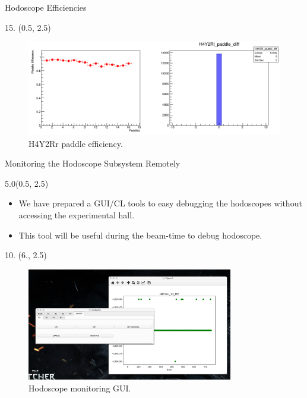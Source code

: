 \documentclass[12pt, xcolor={dvipsnames}, aspectratio = 169, sans,mathserif]{beamer}
\newenvironment{List}[2]
{
\begin{textblock}{#1}#2
\begin{itemize}
}
{
\end{itemize}
\end{textblock}
}
\newenvironment{Pic}[2]
{
\begin{textblock}{#1} #2
\begin{figure}
}
{
\end{figure}
\end{textblock}
}
\begin{document}
\begin{frame}{Hodoscope Efficiencies}
\begin{Pic}{15.}{(0.5, 2.5)}
  \includegraphics[width=15.0cm]{imgs/H4Y2Rr_paddle_diff.png}
  \caption{H4Y2Rr paddle efficiency.}
\end{Pic}
\end{frame}

\begin{frame}[fragile]{Monitoring the Hodoscope Subsystem Remotely}
\begin{List}{5.0}{(0.5, 2.5)}

  \item We have prepared a GUI/CL tools to easy debugging the hodoscopes without accessing the experimental hall.

  \item This tool will be useful during the beam-time to debug hodoscope.

\end{List}

\begin{Pic}{10.}{(6., 2.5)}
  \includegraphics[width=9.0cm]{imgs/hodo_mon.png}
  \caption{Hodoscope monitoring GUI.}
\end{Pic}
\end{frame}
\end{document}
